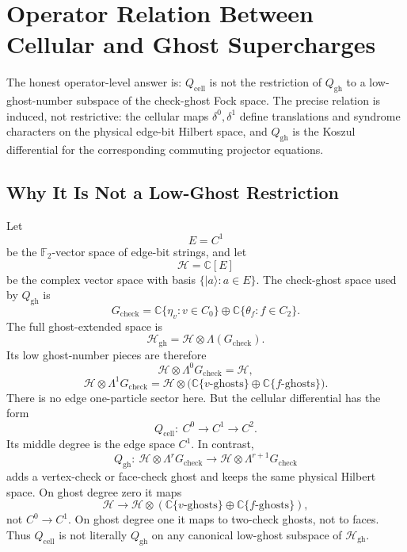 
\section{Operator Relation Between Cellular and Ghost Supercharges}
\label{sec:operator-relation}

The honest operator-level answer is: \(Q_{\mathrm{cell}}\) is not the
restriction of \(Q_{\mathrm{gh}}\) to a low-ghost-number subspace of the
check-ghost Fock space. The precise relation is induced, not restrictive:
the cellular maps \(\delta^0,\delta^1\) define translations and syndrome
characters on the physical edge-bit Hilbert space, and \(Q_{\mathrm{gh}}\) is
the Koszul differential for the corresponding commuting projector equations.

\subsection{Why It Is Not a Low-Ghost Restriction}

Let
\[
  E=C^1
\]
be the \(\mathbb F_2\)-vector space of edge-bit strings, and let
\[
  \mathcal H=\mathbb C[E]
\]
be the complex vector space with basis \(\{|a\rangle:a\in E\}\). The
check-ghost space used by \(Q_{\mathrm{gh}}\) is
\[
  G_{\mathrm{check}}
  =\mathbb C\{\eta_v:v\in C_0\}
  \oplus \mathbb C\{\theta_f:f\in C_2\}.
\]
The full ghost-extended space is
\[
  \mathcal H_{\mathrm{gh}}
  =
  \mathcal H\otimes\Lambda(G_{\mathrm{check}}).
\]
Its low ghost-number pieces are therefore
\[
  \mathcal H\otimes\Lambda^0G_{\mathrm{check}}=\mathcal H,
\]
\[
  \mathcal H\otimes\Lambda^1G_{\mathrm{check}}
  =
  \mathcal H\otimes
  \bigl(\mathbb C\{v\text{-ghosts}\}\oplus
        \mathbb C\{f\text{-ghosts}\}\bigr).
\]
There is no edge one-particle sector here. But the cellular differential has
the form
\[
  Q_{\mathrm{cell}}:\ C^0\to C^1\to C^2.
\]
Its middle degree is the edge space \(C^1\). In contrast,
\[
  Q_{\mathrm{gh}}:\ \mathcal H\otimes\Lambda^rG_{\mathrm{check}}
  \longrightarrow
  \mathcal H\otimes\Lambda^{r+1}G_{\mathrm{check}}
\]
adds a vertex-check or face-check ghost and keeps the same physical Hilbert
space. On ghost degree zero it maps
\[
  \mathcal H\longrightarrow
  \mathcal H\otimes(\mathbb C\{v\text{-ghosts}\}\oplus
                    \mathbb C\{f\text{-ghosts}\}),
\]
not \(C^0\to C^1\). On ghost degree one it maps to two-check ghosts, not to
faces. Thus \(Q_{\mathrm{cell}}\) is not literally \(Q_{\mathrm{gh}}\) on any
canonical low-ghost subspace of \(\mathcal H_{\mathrm{gh}}\).

